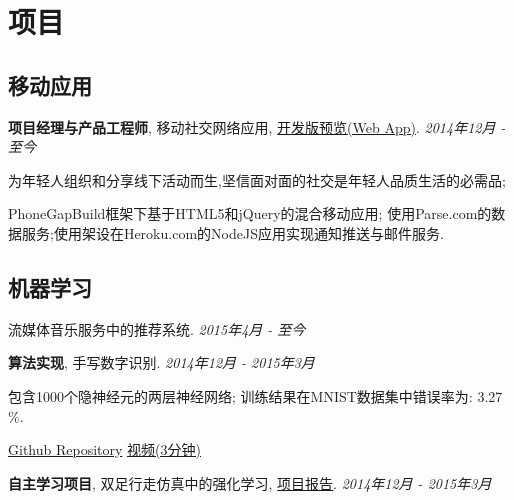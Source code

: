 \documentclass[letterpaper]{article}
\renewenvironment{itemize}{
  \begin{list}{}{
    \setlength{\leftmargin}{1.5em}
  }
}{
  \end{list}
}
\begin{document}
\section*{项目}

\subsection*{移动应用}
\begin{itemize}
	\item[$\circ$] \textbf{项目经理与产品工程师}, 移动社交网络应用, \href{http://yuemeuni.tk/}{\color[rgb]{0.2, 0.7, 0.7} 开发版预览(Web App)}. \hfill {\it \footnotesize 2014年12月 - 至今}
	\begin{itemize}
		\item 为年轻人组织和分享线下活动而生,坚信面对面的社交是年轻人品质生活的必需品;
		\item PhoneGap\texttrademark Build框架下基于HTML5和jQuery的混合移动应用; 使用Parse.com的数据服务;使用架设在Heroku.com的NodeJS应用实现通知推送与邮件服务.
	\end{itemize}
	
\end{itemize}

\subsection*{机器学习}
\begin{itemize}
	\item[$\circ$] 流媒体音乐服务中的推荐系统. \hfill {\it \footnotesize 2015年4月 - 至今}
	\item[$\circ$] \textbf{算法实现}, 手写数字识别. \hfill {\it \footnotesize 2014年12月 - 2015年3月}
	\begin{itemize}
		\item 包含1000个隐神经元的两层神经网络; 训练结果在MNIST数据集中错误率为: 3.27 \%.
		\item \href{https://github.com/Yaliang/Handwritten}{\color[rgb]{0.2, 0.7, 0.7} Github Repository} \hspace{0.2in} \href{http://yaliang-wang.tk/handwritten-digits-recognition-with-neural-network/}{\color[rgb]{0.2, 0.7, 0.7} 视频(3分钟)}
	\end{itemize}
	
	\item[$\circ$] \textbf{自主学习项目}, 双足行走仿真中的强化学习, \href{http://yaliang-wang.tk/media/documents/papers/499\_brenna\_Yaliang\_Final.pdf}{\color[rgb]{0.2, 0.7, 0.7} 项目报告}. \hfill {\it \footnotesize 2014年12月 - 2015年3月}
\end{itemize}
\end{document}
